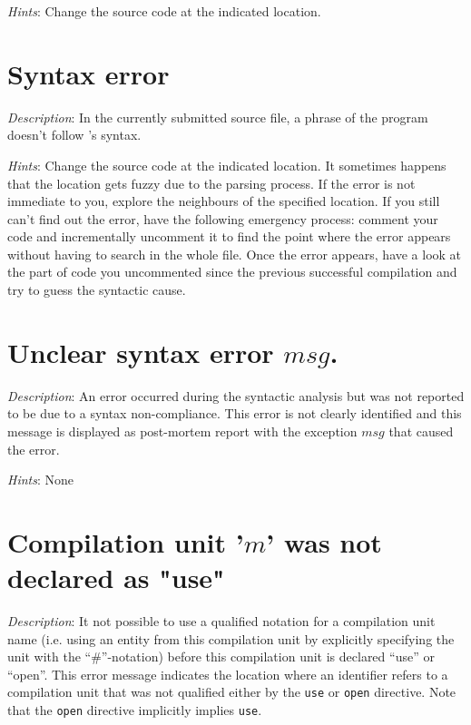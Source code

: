 {\em Hints}: Change the source code at the indicated location.



\section*{Syntax error}
{\em Description}: In the currently submitted source file, a phrase of
the program doesn't follow {\focal}'s syntax.

{\em Hints}: Change the source code at the indicated location. It
sometimes happens that the location gets fuzzy due to the parsing
process. If the error is not immediate to you, explore the neighbours of
 the specified location. If you still can't find out the error,
have the following emergency process: comment your code and
incrementally uncomment it to find the point where the error appears
without having to search in the whole file. Once the error appears,
have a look at the part of code you uncommented since the previous
successful compilation and try to guess the syntactic cause.



\section*{Unclear syntax error $msg$.}
{\em Description}: An error occurred during the syntactic analysis but
was not reported to be due to a syntax non-compliance. This error is
not clearly identified and this message is displayed as post-mortem
report with the exception $msg$ that caused the error.

{\em Hints}: None



\section*{Compilation unit '$m$' was not declared as "use"}
{\em Description}: It not possible to use a qualified notation for a
compilation unit name (i.e. using an entity from this compilation unit
by explicitly specifying the unit with the ``\#''-notation) before this
compilation unit is declared ``use'' or ``open''. This error message
indicates the location where an identifier refers to a compilation
unit that was not qualified either by the {\tt use} or {\tt open}
directive. Note that the {\tt open} directive implicitly implies
{\tt use}.

